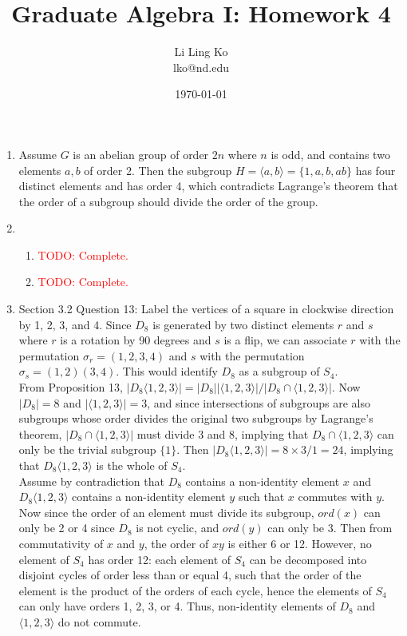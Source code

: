 \documentclass{article}
\newcommand{\TODO}[1]{\textcolor{red}{TODO: #1}}
\begin{document}
\title{Graduate Algebra I: Homework 4}
\author{Li Ling Ko\\ lko@nd.edu}
\date{\today}
\maketitle

\begin{enumerate}
  \item Assume $G$ is an abelian group of order $2n$ where $n$ is odd, and
    contains two elements $a,b$ of order 2. Then the subgroup $H=\langle
    a,b\rangle=\{1,a,b,ab\}$ has four distinct elements and has order 4,
    which contradicts Lagrange's theorem that the order of a subgroup should
    divide the order of the group.

  \item
    \begin{enumerate}
      \item \TODO{Complete.}
      \item \TODO{Complete.}
    \end{enumerate}

  \item Section 3.2 Question 13: Label the vertices of a square in
    clockwise direction by 1, 2, 3, and 4. Since $D_8$ is generated by two
    distinct elements $r$ and $s$ where $r$ is a rotation by 90 degrees and
    $s$ is a flip, we can associate $r$ with the permutation
    $\sigma_r=(1,2,3,4)$ and $s$ with the permutation
    $\sigma_s=(1,2)(3,4)$. This would identify $D_8$ as a subgroup of
    $S_4$. \\

    From Proposition 13, $|D_8\langle 1,2,3\rangle|=|D_8||\langle
    1,2,3\rangle|/|D_8\cap\langle 1,2,3\rangle|$. Now $|D_8|=8$ and
    $|\langle 1,2,3\rangle|=3$, and since intersections of subgroups are
    also subgroups whose order divides the original two subgroups by
    Lagrange's theorem, $|D_8\cap\langle 1,2,3\rangle|$ must divide 3 and
    8, implying that $D_8\cap\langle 1,2,3\rangle$ can only be the trivial
    subgroup $\{1\}$. Then $|D_8\langle 1,2,3\rangle|=8\times 3/1=24$,
    implying that $D_8\langle 1,2,3\rangle$ is the whole of $S_4$. \\

    Assume by contradiction that $D_8$ contains a non-identity element $x$
    and $D_8\langle 1,2,3\rangle$ contains a non-identity element $y$ such
    that $x$ commutes with $y$. Now since the order of an element must
    divide its subgroup, $ord(x)$ can only be 2 or 4 since $D_8$ is not
    cyclic, and $ord(y)$ can only be 3. Then from commutativity of $x$ and
    $y$, the order of $xy$ is either 6 or 12. However, no element of $S_4$
    has order 12: each element of $S_4$ can be decomposed into disjoint
    cycles of order less than or equal 4, such that the order of the
    element is the product of the orders of each cycle, hence the elements
    of $S_4$ can only have orders 1, 2, 3, or 4. Thus, non-identity
    elements of $D_8$ and $\langle 1,2,3\rangle$ do not commute.


\end{enumerate}
\end{document}

